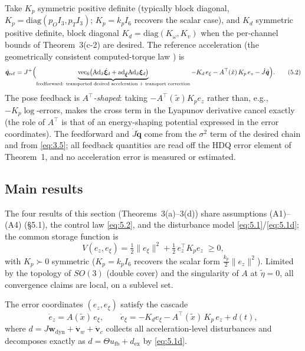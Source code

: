 Take $K_p$ symmetric positive definite (typically block diagonal, $K_p=\mathrm{diag}(p_O I_3,p_T I_3)$; $K_p=k_pI_6$ recovers the scalar case), and $K_d$ symmetric positive definite, block diagonal $K_d=\mathrm{diag}(K_\omega,K_v)$ when the per-channel bounds of Theorem~3(c-2) are desired. The reference acceleration (the geometrically consistent computed-torque law \cite{LWP80}) is
\begin{equation}
\ddot{\boldsymbol q}_{\mathrm{ref}}
=J^{+}\Bigl(\underbrace{\mathrm{vec}_6\bigl(\mathrm{Ad}_{\tilde x}\dot{\boldsymbol\xi}_d+\mathrm{ad}_{\tilde{\boldsymbol\xi}}\mathrm{Ad}_{\tilde x}\boldsymbol\xi_d\bigr)}_{\text{feedforward: transported desired acceleration + transport correction}}
-K_d\,e_\xi-A^{\top}(\tilde x)\,K_p\,e_z-\dot J\dot{\boldsymbol q}\Bigr).
\tag{5.2}\label{eq:5.2}
\end{equation}
The pose feedback is \emph{$A^\top$-shaped}: taking $-A^\top(\tilde x)K_pe_z$ rather than, e.g., $-K_p\log$-errors, makes the cross term in the Lyapunov derivative cancel exactly (the role of $A^\top$ is that of an energy-shaping potential expressed in the error coordinates). The feedforward and $\dot J\dot{\boldsymbol q}$ come from the $\sigma^2$ term of the desired chain and from \eqref{eq:3.5}; all feedback quantities are read off the HDQ error element of Theorem~1, and no acceleration error is measured or estimated.

\subsection{Main results}

The four results of this section (Theorems~3(a)--3(d)) share assumptions (A1)--(A4) (\S5.1), the control law \eqref{eq:5.2}, and the disturbance model \eqref{eq:5.1}/\eqref{eq:5.1d}; the common storage function is
\begin{equation}
V(e_z,e_\xi)=\tfrac12\|e_\xi\|^2+\tfrac12\,e_z^{\top}K_pe_z\;\ge0 ,
\tag{5.4a}\label{eq:5.4a}
\end{equation}
with $K_p\succ0$ symmetric ($K_p=k_pI_6$ recovers the scalar form $\tfrac{k_p}2\|e_z\|^2$). Limited by the topology of $SO(3)$ (double cover) and the singularity of $A$ at $\tilde\eta=0$, all convergence claims are local, on a sublevel set.

\setcounter{theorem}{2}%
\renewcommand{\thetheorem}{3(a)}%
\begin{theorem}\label{thm:3a}
The error coordinates $(e_z,e_\xi)$ satisfy the cascade
\begin{equation}
\dot e_z=A(\tilde x)\,e_\xi,\qquad
\dot e_\xi=-K_d e_\xi-A^{\top}(\tilde x)\,K_p\,e_z+d(t),
\tag{5.5}\label{eq:5.5}
\end{equation}
where $d=J\boldsymbol w_{\mathrm{dyn}}+\dot{\boldsymbol v}_w+\dot{\boldsymbol v}_c$ collects all acceleration-level disturbances and decomposes exactly as $d=\Theta u_{\mathrm{fb}}+d_{\mathrm{ex}}$ by \eqref{eq:5.1d}.
\end{theorem}


